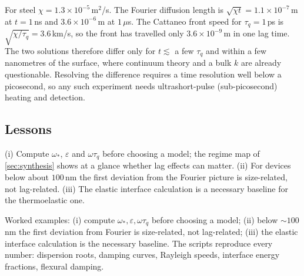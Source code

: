 For steel $\chi=1.3\times10^{-5}$\,m$^2$/s. The Fourier diffusion length is $\sqrt{\chi t}=1.1\times10^{-7}$\,m at $t=1$\,ns and $3.6\times10^{-6}$\,m at $1\,\mu$s. The Cattaneo front speed for $\tau_q=1$\,ps is $\sqrt{\chi/\tau_q}=3.6$\,km/s, so the front has travelled only $3.6\times10^{-9}$\,m in one lag time. The two solutions therefore differ only for $t\lesssim$ a few $\tau_q$ and within a few nanometres of the surface, where continuum theory and a bulk $k$ are already questionable. Resolving the difference requires a time resolution well below a picosecond, so any such experiment needs ultrashort-pulse (sub-picosecond) heating and detection.

\subsection{Lessons}
(i) Compute $\omega_*$, $\varepsilon$ and $\omega\tau_q$ before choosing a model; the regime map of \cref{sec:synthesis} shows at a glance whether lag effects can matter. (ii) For devices below about $100$\,nm the first deviation from the Fourier picture is size-related, not lag-related. (iii) The elastic interface calculation is a necessary baseline for the thermoelastic one.


\begin{summarybox}[Summary]
Worked examples: (i) compute $\omega_*,\varepsilon,\omega\tau_q$ before choosing a model; (ii) below $\sim100$\,nm the first deviation from Fourier is size-related, not lag-related; (iii) the elastic interface calculation is the necessary baseline. The scripts reproduce every number: dispersion roots, damping curves, Rayleigh speeds, interface energy fractions, flexural damping.
\end{summarybox}